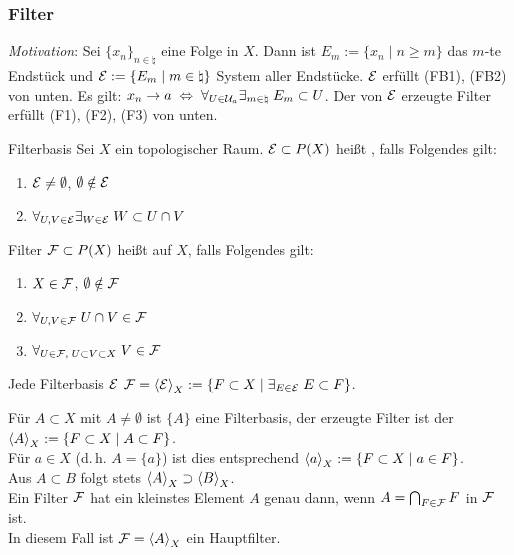 \pagebreak

\subsubsection{%
    Filter%
}

\emph{Motivation}:
Sei $\{x_n\}_{n \in \natural}$ eine Folge in $X$.
Dann ist $E_m := \{x_n \;|\; n \ge m\}$ das $m$-te Endstück
und $\mathcal{E} := \{E_m \;|\; m \in \natural\}$ System aller Endstücke.
$\mathcal{E}$ erfüllt (FB1), (FB2) von unten.
Es gilt: $x_n \to a \;\Leftrightarrow\;
\forall_{U \in \mathcal{U}_a} \exists_{m \in \natural}\; E_m \subset U$.
Der von $\mathcal{E}$ erzeugte Filter erfüllt (F1), (F2), (F3) von unten.

\begin{Def}{Filterbasis}
    Sei $X$ ein topologischer Raum.
    $\mathcal{E} \subset P(X)$ heißt , falls Folgendes gilt:
    \begin{enumerate}[label=(FB\arabic*)]
        \item
        $\mathcal{E} \not= \emptyset$, $\emptyset \notin \mathcal{E}$
        
        \item
        $\forall_{U, V \in \mathcal{E}} \exists_{W \in \mathcal{E}}\; W \subset U \cap V$
    \end{enumerate}
\end{Def}

\begin{Def}{Filter}
    $\mathcal{F} \subset P(X)$ heißt  auf $X$, falls Folgendes gilt:
    \begin{enumerate}[label=(F\arabic*)]
        \item
        $X \in \mathcal{F}$, $\emptyset \notin \mathcal{F}$
        
        \item
        $\forall_{U, V \in \mathcal{F}}\; U \cap V \in \mathcal{F}$
        
        \item
        $\forall_{U \in \mathcal{F},\; U \subset V \subset X}\; V \in \mathcal{F}$
    \end{enumerate}
    Jede Filterbasis $\mathcal{E}$ 
    $\mathcal{F} = \left\langle{\ensuremath{\mathcal{E}}}\right\rangle_X := \{F \subset X \;|\;
    \exists_{E \in \mathcal{E}}\; E \subset F\}$.
\end{Def}

\linie

\begin{Bsp}
    Für $A \subset X$ mit $A \not= \emptyset$ ist $\{A\}$ eine Filterbasis,
    der erzeugte Filter ist der 
    $\left\langle{A}\right\rangle_X := \{F \subset X \;|\; A \subset F\}$. \\
    Für $a \in X$ (d.\,h. $A = \{a\}$) ist dies entsprechend
    $\left\langle{a}\right\rangle_X := \{F \subset X \;|\; a \in F\}$. \\
    Aus $A \subset B$ folgt stets $\left\langle{A}\right\rangle_X \supset \left\langle{B}\right\rangle_X$. \\
    Ein Filter $\mathcal{F}$ hat ein kleinstes Element $A$ genau dann, wenn
    $A = \bigcap_{F \in \mathcal{F}} F$ in $\mathcal{F}$ ist. \\
    In diesem Fall ist $\mathcal{F} = \left\langle{A}\right\rangle_X$ ein Hauptfilter.
\end{Bsp}

